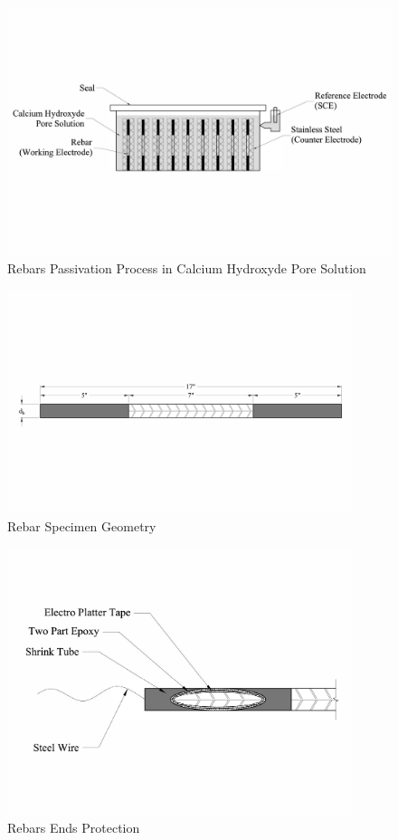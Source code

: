 \begin{figure}[htbp]
	\centering
	\includegraphics[width=1.0\textwidth]{Chapter-4/figs/AnodicPolarization_01}
	\caption{Rebars Passivation Process in Calcium Hydroxyde Pore Solution}
	\label{fig:RebarPassivation}
\end{figure}

\begin{figure}[htbp]
	\centering
	\includegraphics[width=0.9\textwidth]{Chapter-4/figs/RebarSamples}
	\caption{Rebar Specimen Geometry}
	\label{fig:RebarSpecimenGeomtry}
\end{figure}

\begin{figure}[htbp]
	\centering
	\includegraphics[width=0.9\textwidth]{Chapter-4/figs/Rebar_Ends}
	\caption{Rebars Ends Protection}
	\label{fig:RebarEndsProtection}
\end{figure}


